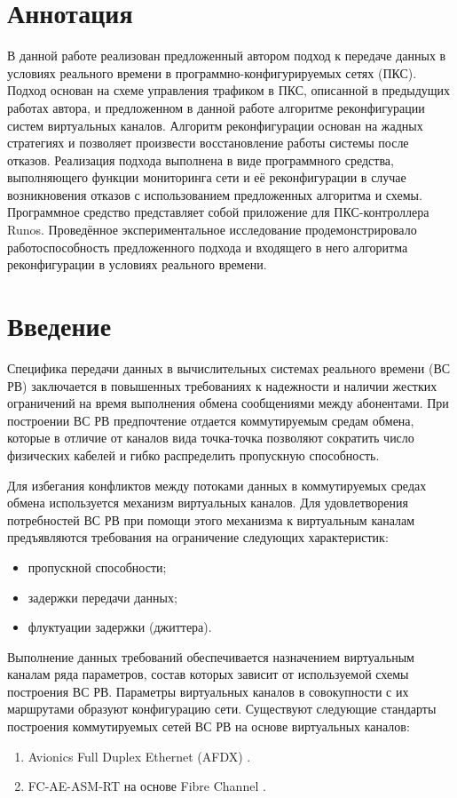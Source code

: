 \documentclass[12pt, a4paper]{article}
\begin{document}
\section*{Аннотация}
В данной работе реализован предложенный автором подход к передаче данных в условиях реального времени в программно-конфигурируемых сетях (ПКС). Подход основан на схеме управления трафиком в ПКС, описанной в предыдущих работах автора, и предложенном в данной работе алгоритме реконфигурации систем виртуальных каналов. Алгоритм реконфигурации основан на жадных стратегиях и позволяет произвести восстановление работы системы после отказов. Реализация подхода выполнена в виде программного средства, выполняющего функции мониторинга сети и её реконфигурации в случае возникновения отказов с использованием предложенных алгоритма и схемы. Программное средство представляет собой приложение для ПКС-контроллера Runos. Проведённое экспериментальное исследование продемонстрировало работоспособность предложенного подхода и входящего в него алгоритма реконфигурации в условиях реального времени.

\renewcommand{\contentsname}{Содержание}
\tableofcontents

\section*{Введение}
Специфика передачи данных в вычислительных системах реального времени (ВС РВ) заключается в повышенных требованиях к надежности и наличии жестких ограничений на время выполнения обмена сообщениями между абонентами. При построении ВС РВ предпочтение отдается коммутируемым средам обмена, которые в отличие от каналов вида точка-точка позволяют сократить число физических кабелей и гибко распределить пропускную способность.

Для избегания конфликтов между потоками данных в коммутируемых средах обмена используется механизм виртуальных каналов. Для удовлетворения потребностей ВС РВ при помощи этого механизма к виртуальным каналам предъявляются требования на ограничение следующих характеристик:
\begin{itemize}
	\item пропускной способности;
	\item задержки передачи данных;
	\item флуктуации задержки (джиттера).
\end{itemize}

Выполнение данных требований обеспечивается назначением виртуальным каналам ряда параметров, состав которых зависит от используемой схемы построения ВС РВ. Параметры виртуальных каналов в совокупности с их маршрутами образуют конфигурацию сети. Существуют следующие стандарты построения коммутируемых сетей ВС РВ на основе виртуальных каналов:
\begin{enumerate}
	\item Avionics Full Duplex Ethernet (AFDX) \cite{afdx}.
	\item FC-AE-ASM-RT на основе Fibre Channel \cite{fcaert}.
\end{enumerate}
\end{document}
